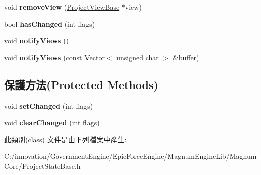 \begin{DoxyCompactItemize}
\item 
void {\bfseries remove\+View} (\hyperlink{class_epic_force_1_1_project_view_base}{Project\+View\+Base} $\ast$view)\hypertarget{class_epic_force_1_1_project_model_base_a9a97651d8ceb4e1b0532feadbd796bd2}{}\label{class_epic_force_1_1_project_model_base_a9a97651d8ceb4e1b0532feadbd796bd2}

\item 
bool {\bfseries has\+Changed} (int flags)\hypertarget{class_epic_force_1_1_project_model_base_a73b1a57bfa26e5ea47408f19538dc5fa}{}\label{class_epic_force_1_1_project_model_base_a73b1a57bfa26e5ea47408f19538dc5fa}

\item 
void {\bfseries notify\+Views} ()\hypertarget{class_epic_force_1_1_project_model_base_ad84724bbf7f32c55f0bd32f184b3547f}{}\label{class_epic_force_1_1_project_model_base_ad84724bbf7f32c55f0bd32f184b3547f}

\item 
void {\bfseries notify\+Views} (const \hyperlink{class_i_dream_sky_1_1_vector}{Vector}$<$ unsigned char $>$ \&buffer)\hypertarget{class_epic_force_1_1_project_model_base_a0ba123ac1a14c1fb89cfd7be0e028ff6}{}\label{class_epic_force_1_1_project_model_base_a0ba123ac1a14c1fb89cfd7be0e028ff6}

\end{DoxyCompactItemize}
\subsection*{保護方法(Protected Methods)}
\begin{DoxyCompactItemize}
\item 
void {\bfseries set\+Changed} (int flags)\hypertarget{class_epic_force_1_1_project_model_base_a49b161d9dcbfb5b76f03f03473ab6236}{}\label{class_epic_force_1_1_project_model_base_a49b161d9dcbfb5b76f03f03473ab6236}

\item 
void {\bfseries clear\+Changed} (int flags)\hypertarget{class_epic_force_1_1_project_model_base_ae3ad2698fdcab8b7a54d2ae9e357ca01}{}\label{class_epic_force_1_1_project_model_base_ae3ad2698fdcab8b7a54d2ae9e357ca01}

\end{DoxyCompactItemize}


此類別(class) 文件是由下列檔案中產生\+:\begin{DoxyCompactItemize}
\item 
C\+:/innovation/\+Government\+Engine/\+Epic\+Force\+Engine/\+Magnum\+Engine\+Lib/\+Magnum\+Core/Project\+State\+Base.\+h\end{DoxyCompactItemize}
